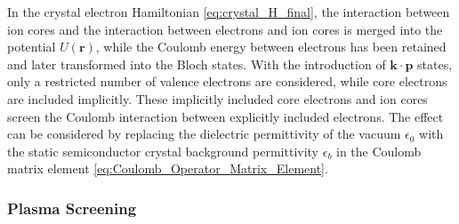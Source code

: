In the crystal electron Hamiltonian \ref{eq:crystal_H_final}, the
interaction between ion cores and the interaction between electrons
and ion cores is merged into the potential $U(\mathbf{r})$, while
the Coulomb energy between electrons has been retained and later transformed
into the Bloch states. With the introduction of $\mathbf{k}\cdot\mathbf{p}$
states, only a restricted number of valence electrons are considered,
while core electrons are included implicitly. These implicitly included
core electrons and ion cores screen the Coulomb interaction between
explicitly included electrons. The effect can be considered by replacing
the dielectric permittivity of the vacuum $\epsilon_{0}$ with the
static semiconductor crystal background permittivity $\epsilon_{b}$
in the Coulomb matrix element \ref{eq:Coulomb_Operator_Matrix_Element}.


\subsubsection{Plasma Screening}

